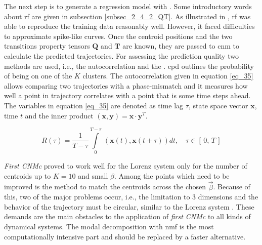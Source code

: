 The next step is to generate a regression model with .
Some introductory words about \gls{rf} are given in subsection \ref{subsec_2_4_2_QT}. 
As illustrated in \cite{Max2021}, \gls{rf} was able to reproduce the training data reasonably well.
However, it faced difficulties to approximate spike-like curves. 
Once the centroid positions and the two transitions property tensors $\bm Q$ and $\bm T$ are known, they are passed to \gls{cnm} to calculate the predicted trajectories. 
For assessing the prediction quality two methods are used, i.e., the autocorrelation and the . 
\gls{cpd} outlines the probability of being on one of the $K$ clusters. 
The autocorrelation given in equation \eqref{eq_35} allows comparing two trajectories with a phase-mismatch \cite{protas2015optimal} and it measures how well a point in trajectory correlates with a point that is some time steps ahead.
The variables in equation \eqref{eq_35} are denoted as time lag $\tau$, state space vector $\bm x$, time $t$ and the inner product $(\bm x, \bm y) = \bm x \cdot \bm{y}^T$.  \newline

\begin{equation}
    R(\tau) = \frac{1}{T - \tau} \int\limits_{0}^{T-\tau}\, (\bm{x} (t), \bm{x}(t+ \tau))    dt, \quad \tau \in [\, 0, \, T\,]
    \label{eq_35}
\end{equation}

\emph{First CNMc} proved to work well for the Lorenz system only for the number of centroids up to $K=10$ and small $\beta$. 
Among the points which need to be improved is the method to match the centroids across the chosen $\vec{\beta}$. 
Because of this, two of the major problems occur, i.e., the limitation to 3 dimensions and the behavior of the trajectory must be circular, similar to the Lorenz system \cite{lorenz1963deterministic}. 
These demands are the main obstacles to the application of \emph{first CNMc} to all kinds of dynamical systems. 
The modal decomposition with \gls{nmf} is the most computationally intensive part and should be replaced by a faster alternative.


